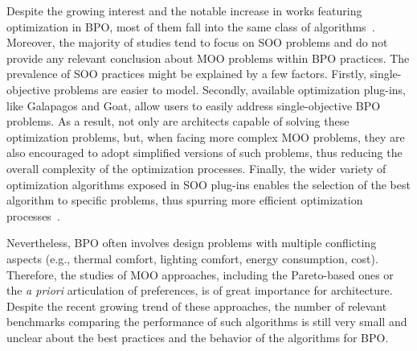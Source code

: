 	Despite the growing interest and the notable increase in works featuring optimization in \ac{BPO}, most of them fall into the same class of algorithms~\cite{Evins2013,Nguyen2014}. Moreover, the majority of studies tend to focus on \ac{SOO} problems and do not provide any relevant conclusion about \ac{MOO} problems within \ac{BPO} practices. The prevalence of \ac{SOO} practices might be explained by a few factors. Firstly, single-objective problems are easier to model. Secondly, available optimization plug-ins, like Galapagos and Goat, allow users to easily address single-objective \ac{BPO} problems. As a result, not only are architects capable of solving these optimization problems, but, when facing more complex \ac{MOO} problems, they are also encouraged to adopt simplified versions of such problems, thus reducing the overall complexity of the optimization processes. Finally, the wider variety of optimization algorithms exposed in \ac{SOO} plug-ins enables the selection of the best algorithm to specific problems, thus spurring more efficient optimization processes~\cite{Wortmann2016BBO}.  
	
	Nevertheless, \ac{BPO} often involves design problems with multiple conflicting aspects (e.g., thermal comfort, lighting comfort, energy consumption, cost). Therefore, the studies of \ac{MOO} approaches, including the Pareto-based ones or the \textit{a priori} articulation of preferences, is of great importance for architecture. Despite the recent growing trend of these approaches\cite{Evins2013,Wortmann2017Opossum}, the number of relevant benchmarks comparing the performance of such algorithms is still very small and unclear about the best practices and the behavior of the algorithms for \ac{BPO}.  
